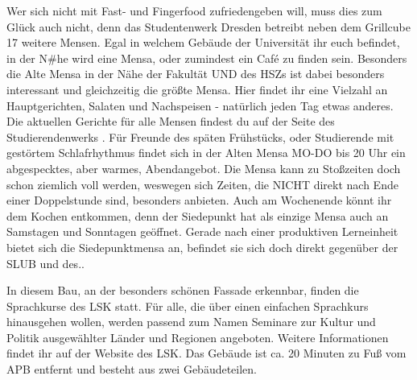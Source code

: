 Wer sich nicht mit Fast- und Fingerfood zufriedengeben will, muss dies zum Glück auch nicht, denn das Studentenwerk Dresden betreibt neben dem Grillcube 17 weitere Mensen.
Egal in welchem Gebäude der Universität ihr euch befindet, in der N#he wird eine Mensa, oder zumindest ein Café zu finden sein.
Besonders die Alte Mensa in der Nähe der Fakultät UND des HSZs ist dabei besonders interessant und gleichzeitig die größte Mensa.
Hier findet ihr eine Vielzahl an Hauptgerichten, Salaten und Nachspeisen - natürlich jeden Tag etwas anderes.
Die aktuellen Gerichte für alle Mensen findest du auf der Seite des Studierendenwerks .
Für Freunde des späten Frühstücks, oder Studierende mit gestörtem Schlafrhythmus findet sich in der Alten Mensa MO-DO bis 20 Uhr ein abgespecktes, aber warmes, Abendangebot.
Die Mensa kann zu Stoßzeiten doch schon ziemlich voll werden, weswegen sich Zeiten, die NICHT direkt nach Ende einer Doppelstunde sind, besonders anbieten.
Auch am Wochenende könnt ihr dem Kochen entkommen, denn der Siedepunkt hat als einzige Mensa auch an Samstagen und Sonntagen geöffnet.
Gerade nach einer produktiven Lerneinheit bietet sich die Siedepunktmensa an, befindet sie sich doch direkt gegenüber der SLUB und des..


In diesem Bau, an der besonders schönen Fassade erkennbar, finden die Sprachkurse des LSK statt.
Für alle, die über einen einfachen Sprachkurs hinausgehen wollen, werden passend zum Namen Seminare zur Kultur und Politik ausgewählter Länder und Regionen angeboten.
Weitere Informationen findet ihr auf der Website des LSK.
Das Gebäude ist ca. 20 Minuten zu Fuß vom APB entfernt und besteht aus zwei Gebäudeteilen.